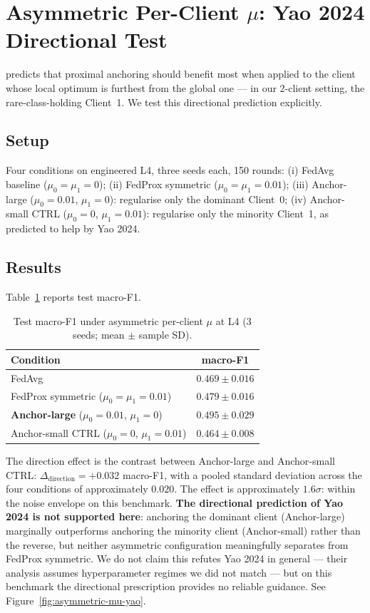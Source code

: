 \documentclass[11pt,a4paper]{report}
\begin{document}
\section{Asymmetric Per-Client $\mu$: Yao 2024 Directional Test}
\label{sec:asymmetric-mu-yao}

\citet{yao2024} predicts that proximal anchoring should benefit most
when applied to the client whose local optimum is furthest from the
global one --- in our 2-client setting, the rare-class-holding
Client~1. We test this directional prediction explicitly.

\subsection{Setup}
Four conditions on engineered L4, three seeds each, 150 rounds:
(i) FedAvg baseline ($\mu_0 = \mu_1 = 0$);
(ii) FedProx symmetric ($\mu_0 = \mu_1 = 0.01$);
(iii) Anchor-large ($\mu_0 = 0.01$, $\mu_1 = 0$): regularise only the
dominant Client~0;
(iv) Anchor-small CTRL ($\mu_0 = 0$, $\mu_1 = 0.01$): regularise only
the minority Client~1, as predicted to help by Yao 2024.

\subsection{Results}
Table~\ref{tab:asymmetric-mu-yao} reports test macro-F1.

\begin{table}[!htbp]
\centering
\caption{Test macro-F1 under asymmetric per-client $\mu$ at L4
(3 seeds; mean $\pm$ sample SD).}
\label{tab:asymmetric-mu-yao}
\small
\begin{tabular}{lc}
\toprule
Condition & macro-F1 \\
\midrule
FedAvg                                                  & $0.469 \pm 0.016$ \\
FedProx symmetric ($\mu_0{=}\mu_1{=}0.01$)              & $0.479 \pm 0.016$ \\
\textbf{Anchor-large} ($\mu_0{=}0.01$, $\mu_1{=}0$)     & $0.495 \pm 0.029$ \\
Anchor-small CTRL ($\mu_0{=}0$, $\mu_1{=}0.01$)         & $0.464 \pm 0.008$ \\
\bottomrule
\end{tabular}
\end{table}

The direction effect is the contrast between Anchor-large and
Anchor-small CTRL: $\Delta_{\text{direction}} = +0.032$ macro-F1, with
a pooled standard deviation across the four conditions of
approximately $0.020$. The effect is approximately $1.6\sigma$:
within the noise envelope on this benchmark. \textbf{The directional
prediction of Yao 2024 is not supported here}: anchoring the dominant
client (Anchor-large) marginally outperforms anchoring the minority
client (Anchor-small) rather than the reverse, but neither asymmetric
configuration meaningfully separates from FedProx symmetric. We do
not claim this refutes Yao 2024 in general --- their analysis
assumes hyperparameter regimes we did not match --- but on this
benchmark the directional prescription provides no reliable
guidance. See Figure~\ref{fig:asymmetric-mu-yao}.
\end{document}
